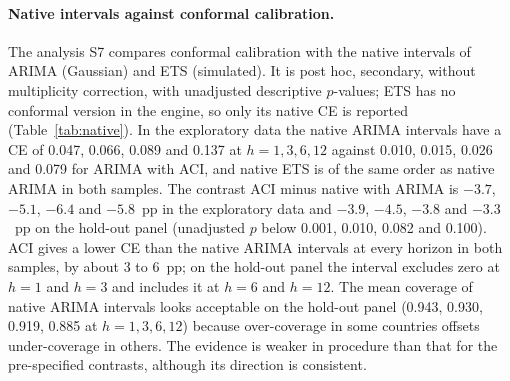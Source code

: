 \paragraph{Native intervals against conformal calibration.}\label{sec:native} The analysis S7 compares conformal calibration with the native intervals of ARIMA (Gaussian) and ETS (simulated). It is post hoc, secondary, without multiplicity correction, with unadjusted descriptive $p$-values; ETS has no conformal version in the engine, so only its native CE is reported (Table~\ref{tab:native}). In the exploratory data the native ARIMA intervals have a CE of 0.047, 0.066, 0.089 and 0.137 at $h=1,3,6,12$ against 0.010, 0.015, 0.026 and 0.079 for ARIMA with ACI, and native ETS is of the same order as native ARIMA in both samples. The contrast ACI minus native with ARIMA is $-3.7$, $-5.1$, $-6.4$ and $-5.8$~pp in the exploratory data and $-3.9$, $-4.5$, $-3.8$ and $-3.3$~pp on the hold-out panel (unadjusted $p$ below 0.001, 0.010, 0.082 and 0.100). ACI gives a lower CE than the native ARIMA intervals at every horizon in both samples, by about 3 to 6~pp; on the hold-out panel the interval excludes zero at $h=1$ and $h=3$ and includes it at $h=6$ and $h=12$. The mean coverage of native ARIMA intervals looks acceptable on the hold-out panel (0.943, 0.930, 0.919, 0.885 at $h=1,3,6,12$) because over-coverage in some countries offsets under-coverage in others. The evidence is weaker in procedure than that for the pre-specified contrasts, although its direction is consistent.

\begin{table}[t]
\centering
\caption{Ablation over the reference interval (S7, post hoc): CE of native ARIMA and ETS intervals and of ARIMA with ACI, and the contrast ACI minus native (pp of CE, 95\% interval, unadjusted $p$).}
\label{tab:native}
\small
\fittable{}
\end{table}

